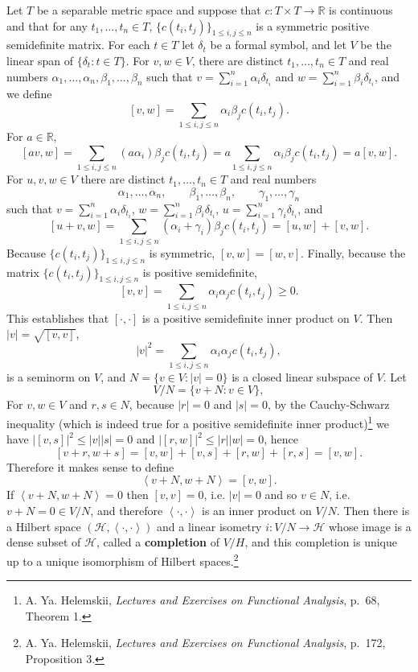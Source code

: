 \documentclass{article}
\newcommand{\inner}[2]{\left\langle #1, #2 \right\rangle}
\theoremstyle{definition}
\begin{document}
Let $T$ be a separable metric space
and suppose that $c:T \times T \to \mathbb{R}$ is continuous
and that for any  $t_1,\ldots,t_n \in T$, 
$\{c(t_i,t_j)\}_{1 \leq i,j \leq n}$ is a symmetric positive semidefinite matrix. 
For each $t \in T$ let $\delta_t$ be a formal symbol, and let
$V$ be the linear span of $\{\delta_t: t \in T\}$. 
For $v,w \in V$, there are 
distinct $t_1,\ldots,t_n \in T$ and real numbers $\alpha_1,\ldots,\alpha_n,\beta_1,\ldots,\beta_n$
such that 
$v=\sum_{i=1}^n \alpha_i \delta_{t_i}$ and $w=\sum_{i=1}^n \beta_i \delta_{t_i}$, 
 and we define
\[
[v,w] = \sum_{1 \leq i,j \leq n} \alpha_i \beta_j c(t_i,t_j).
\]
For $a \in \mathbb{R}$,
\[
[a v,w] =  \sum_{1 \leq i,j \leq n} (a \alpha_i) \beta_j c(t_i,t_j)
=a  \sum_{1 \leq i,j \leq n} \alpha_i \beta_j c(t_i,t_j)
=a[v,w].
\]
For $u,v,w \in V$ there are 
distinct $t_1,\ldots,t_n \in T$ and real numbers
\[
\alpha_1,\ldots,\alpha_n,\qquad \beta_1,\ldots,\beta_n, \qquad
\gamma_1,\ldots,\gamma_n
\]
 such that
$v=\sum_{i=1}^n \alpha_i \delta_{t_i}$, $w=\sum_{i=1}^n \beta_i \delta_{t_i}$, 
$u=\sum_{i=1}^n \gamma_i \delta_{t_i}$, and
\[
[u+v,w] = \sum_{1 \leq i,j \leq n} (\alpha_i+\gamma_i)\beta_j c(t_i,t_j)
=[u,w]+[v,w].
\]
Because $\{c(t_i,t_j)\}_{1 \leq i,j \leq n}$ is symmetric, $[v,w]=[w,v]$. 
Finally, because the matrix $\{c(t_i,t_j)\}_{1 \leq i,j \leq n}$ is positive semidefinite,
\[
[v,v]=\sum_{1 \leq i,j \leq n} \alpha_i \alpha_j c(t_i,t_j)
\geq 0.
\]
This establishes that $[\cdot,\cdot]$ is a positive semidefinite inner product on $V$. 
Then $|v| = \sqrt{[v,v]}$,
\[
|v|^2 =  \sum_{1 \leq i,j \leq n} \alpha_i \alpha_j c(t_i,t_j),
\]
is a seminorm on $V$, and $N=\{v \in V: |v|=0\}$ is a closed linear subspace of $V$. Let
\[
V/N = \{v+N: v \in V\},
\] 
For $v,w \in V$ and $r,s \in N$, because $|r|=0$ and $|s|=0$, by the Cauchy-Schwarz inequality (which
is indeed true for a positive semidefinite inner product)\footnote{A. Ya. Helemskii,
{\em Lectures and Exercises on Functional Analysis}, p.~68, Theorem 1.}
we have
$|[v,s]|^2 \leq |v||s| = 0$ and $|[r,w]|^2 \leq |r||w|=0$, hence 
\[
[v+r,w+s] = [v,w]+[v,s]+[r,w]+[r,s] = [v,w].
\]
Therefore it makes sense to define 
\[
\inner{v+N}{w+N} = [v,w].
\]
If $\inner{v+N}{w+N}=0$ then $[v,v]=0$, i.e. $|v|=0$ and so $v \in N$, i.e. $v+N=0 \in V/N$, and therefore
$\inner{\cdot}{\cdot}$ is an inner product on $V/N$. 
Then there is a Hilbert space $(\mathscr{H},\inner{\cdot}{\cdot})$ and a
linear isometry $i:V/N \to \mathscr{H}$ whose image is a dense subset of $\mathscr{H}$, called a \textbf{completion} of $V/H$,
and this completion is unique up to a unique isomorphism of Hilbert spaces.\footnote{A. Ya. Helemskii,
{\em Lectures and Exercises on Functional Analysis}, p.~172, Proposition 3.}
\end{document}
